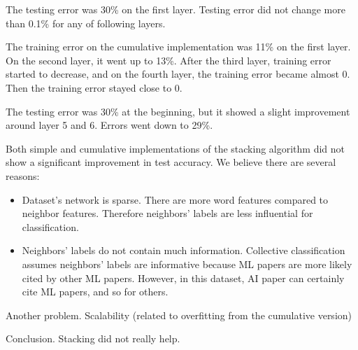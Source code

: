 The testing error was 30\% on the first layer. Testing error did not change more than 0.1\% for any of following layers.

The training error on the cumulative implementation was 11\% on the first layer. On the second layer, it went up to 13\%. After the third layer, training error started to decrease, and on the fourth layer, the training error became almost 0. Then the training error stayed close to 0. 

The testing error was 30\% at the beginning, but it showed a slight improvement around layer 5 and 6. Errors went down to 29\%. 

Both simple and cumulative implementations of the stacking algorithm did not show a significant improvement in test accuracy. We believe there are several reasons:
\begin{itemize}
	\item Dataset's network is sparse. There are more word features compared to neighbor features. Therefore neighbors' labels are less influential for classification.
	\item Neighbors' labels do not contain much information. Collective classification assumes neighbors' labels are informative because ML papers are more likely cited by other ML papers. However, in this dataset, AI paper can certainly cite ML papers, and so for others.
\end{itemize}
Another problem. Scalability (related to overfitting from the cumulative version)

Conclusion. Stacking did not really help.
 
 
